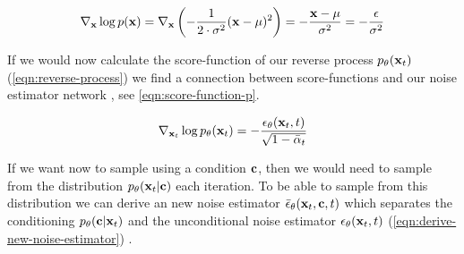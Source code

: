 \begin{equation}
   \label{eqn:score-function}
   \nabla_{\mathbf{x}} \log p(\mathbf{x}) = \nabla_{\mathbf{x}} \left( - \frac{1}{2\cdot\sigma^2}(\mathbf{x}-\mu)^2\right) = - \frac{\mathbf{x} - \mu}{\sigma^2} = - \frac{\epsilon}{\sigma^2}
\end{equation}

If we would now calculate the score-function of our reverse process $p_\theta(\mathbf{x}_t)$ (\autoref{eqn:reverse-process})
we find a connection between score-functions and our noise estimator network \parencite{sbgm}, see \autoref{eqn:score-function-p}.

\begin{equation}
   \label{eqn:score-function-p}
   \nabla_{\mathbf{x}_t} \log p_\theta(\mathbf{x}_t) = - \frac{\epsilon_\theta(\mathbf{x}_t, t)}{\sqrt{1 - \bar{\alpha}_t}}
\end{equation}

If we want now to sample using a condition $\mathbf{c}$, then we would need to sample from the distribution $p_\theta(\mathbf{x}_t | \mathbf{c})$ each iteration.
To be able to sample from this distribution we can derive an new noise estimator $\bar{\epsilon}_\theta(\mathbf{x}_t, \mathbf{c}, t)$ which
separates the conditioning $p_\theta(\mathbf{c}|\mathbf{x}_t)$ and the unconditional noise estimator $\epsilon_\theta(\mathbf{x}_t, t)$ (\autoref{eqn:derive-new-noise-estimator}) \parencite{sbgm,diffusion-beats-gans}.

